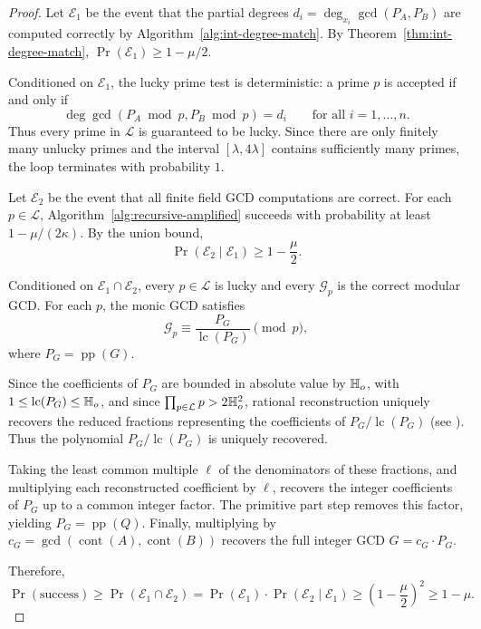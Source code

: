 \documentclass{article}
\numberwithin{equation}{section}
\begin{document}
\begin{proof}
Let \(\mathcal{E}_1\) be the event that the partial degrees \(d_i = \deg_{x_i} \gcd(P_A, P_B)\) are computed correctly by Algorithm~\ref{alg:int-degree-match}. By Theorem~\ref{thm:int-degree-match}, \(\Pr(\mathcal{E}_1) \ge 1 - \mu/2\).

Conditioned on \(\mathcal{E}_1\), the lucky prime test is deterministic: a prime \(p\) is accepted if and only if
\[
\deg \gcd(P_A \bmod p, P_B \bmod p) = d_i \qquad \text{for all } i=1,\dots,n.
\]
Thus every prime in \(\mathcal{L}\) is guaranteed to be lucky. Since there are only finitely many unlucky primes and the interval \([\lambda, 4\lambda]\) contains sufficiently many primes, the loop terminates with probability \(1\).

Let \(\mathcal{E}_2\) be the event that all finite field GCD computations are correct. For each \(p \in \mathcal{L}\), Algorithm~\ref{alg:recursive-amplified} succeeds with probability at least \(1 - \mu/(2\kappa)\). By the union bound,
\[
\Pr(\mathcal{E}_2 \mid \mathcal{E}_1) \ge 1 - \frac{\mu}{2}.
\]

Conditioned on \(\mathcal{E}_1 \cap \mathcal{E}_2\), every \(p \in \mathcal{L}\) is lucky and every \(\mathcal{G}_p\) is the correct modular GCD. For each \(p\), the monic GCD satisfies
\[
\mathcal{G}_p \equiv \frac{P_G}{\operatorname{lc}(P_G)} \pmod{p},
\]
where \(P_G = \operatorname{pp}(G)\).

Since the coefficients of \(P_G\) are bounded in absolute value by \(\mathbb{H}_{o}\), with \(1 \le \operatorname{lc}(P_G) \le \mathbb{H}_{o}\), and since \(\prod_{p \in \mathcal{L}} p > 2\mathbb{H}_{o}^2\), rational reconstruction uniquely recovers the reduced fractions representing the coefficients of \(P_G / \operatorname{lc}(P_G)\) (see \cite{WangPan2003,monagan2004maximal}). Thus the polynomial \(P_G / \operatorname{lc}(P_G)\) is uniquely recovered.


Taking the least common multiple \(\ell\) of the denominators of these fractions, and multiplying each reconstructed coefficient by \(\ell\), recovers the integer coefficients of \(P_G\) up to a common integer factor. The primitive part step removes this factor, yielding \(P_G = \operatorname{pp}(Q)\). Finally, multiplying by \(c_G = \gcd(\operatorname{cont}(A), \operatorname{cont}(B))\) recovers the full integer GCD \(G = c_G \cdot P_G\).

Therefore,
\[
\Pr(\text{success}) \ge \Pr(\mathcal{E}_1 \cap \mathcal{E}_2)
= \Pr(\mathcal{E}_1) \cdot \Pr(\mathcal{E}_2 \mid \mathcal{E}_1)
\ge \left(1 - \frac{\mu}{2}\right)^2
\ge 1 - \mu.
\]
\end{proof}
\end{document}
